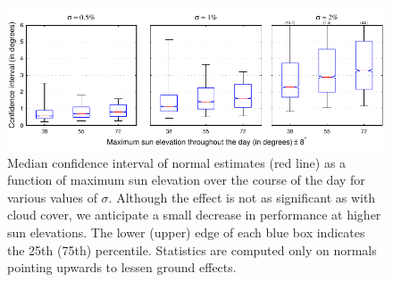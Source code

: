 \begin{figure}[t]
    \centering
    \includegraphics[width=\linewidth]{./figures/confidenceIntervals/sunElevationPlot-topHemisphere.pdf}
    \caption{Median confidence interval of normal estimates (red line) as a function of maximum sun elevation over the course of the day for various values of $\sigma$. Although the effect is not as significant as with cloud cover, we anticipate a small decrease in performance at higher sun elevations. The lower (upper) edge of each blue box indicates the 25th (75th) percentile. Statistics are computed only on normals pointing upwards to lessen ground effects.}
    \label{fig:sun-elevation-plot}
\end{figure}


